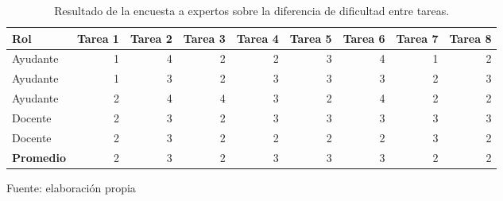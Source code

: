 \documentclass[letterpaper,12pt]{article}
\begin{document}
\begin{table}[H]
  \centering
  \begin{tabular}{|l|r|r|r|r|r|r|r|r|}
    \hline
    \textbf{Rol}      & \multicolumn{1}{l|}{\textbf{Tarea 1}} & \multicolumn{1}{l|}{\textbf{Tarea 2}} & \multicolumn{1}{l|}{\textbf{Tarea 3}} & \multicolumn{1}{l|}{\textbf{Tarea 4}} & \multicolumn{1}{l|}{\textbf{Tarea 5}} & \multicolumn{1}{l|}{\textbf{Tarea 6}} & \multicolumn{1}{l|}{\textbf{Tarea 7}} & \multicolumn{1}{l|}{\textbf{Tarea 8}} \\ \hline
    Ayudante          & 1                                     & 4                                     & 2                                     & 2                                     & 3                                     & 4                                     & 1                                     & 2                                     \\ \hline
    Ayudante          & 1                                     & 3                                     & 2                                     & 3                                     & 3                                     & 3                                     & 2                                     & 3                                     \\ \hline
    Ayudante          & 2                                     & 4                                     & 4                                     & 3                                     & 2                                     & 4                                     & 2                                     & 2                                     \\ \hline
    Docente           & 2                                     & 3                                     & 2                                     & 3                                     & 3                                     & 3                                     & 3                                     & 3                                     \\ \hline
    Docente           & 2                                     & 3                                     & 2                                     & 2                                     & 2                                     & 2                                     & 3                                     & 2                                     \\ \hline
    \rowcolor[HTML]{EFEFEF}
    \textbf{Promedio} & 2                                     & 3                                     & 2                                     & 3                                     & 3                                     & 3                                     & 2                                     & 2                                     \\ \hline
  \end{tabular}
  \caption{Resultado de la encuesta a expertos sobre la diferencia de dificultad entre tareas. }Fuente: elaboración propia
  \label{tab:encuesta1}
\end{table}
\end{document}
